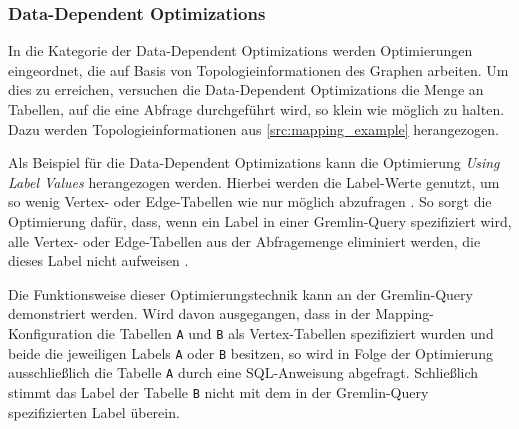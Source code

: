 \subsubsection{Data-Dependent Optimizations}
In die Kategorie der Data-Dependent Optimizations werden Optimierungen eingeordnet, die auf Basis von Topologieinformationen des Graphen arbeiten. Um dies zu erreichen, versuchen die Data-Dependent Optimizations die Menge an Tabellen, auf die eine Abfrage durchgeführt wird, so klein wie möglich zu halten. Dazu werden Topologieinformationen aus \autoref{src:mapping_example} herangezogen. 

Als Beispiel für die Data-Dependent Optimizations kann die Optimierung \textit{Using Label Values} herangezogen werden. Hierbei werden die Label-Werte genutzt, um so wenig Vertex- oder Edge-Tabellen wie nur möglich abzufragen \cite{sigmod_tian}. So sorgt die Optimierung dafür, dass, wenn ein Label in einer Gremlin-Query spezifiziert wird, alle Vertex- oder Edge-Tabellen aus der Abfragemenge eliminiert werden, die dieses Label nicht aufweisen \cite{sigmod_tian}.

Die Funktionsweise dieser Optimierungstechnik kann an der Gremlin-Query  demonstriert werden. Wird davon ausgegangen, dass in der Mapping-Konfiguration die Tabellen \texttt{A} und \texttt{B} als Vertex-Tabellen spezifiziert wurden und beide die jeweiligen Labels \texttt{A} oder \texttt{B} besitzen, so wird in Folge der Optimierung ausschließlich die Tabelle \texttt{A} durch eine SQL-Anweisung abgefragt. Schließlich stimmt das Label der Tabelle \texttt{B} nicht mit dem in der Gremlin-Query spezifizierten Label überein.

